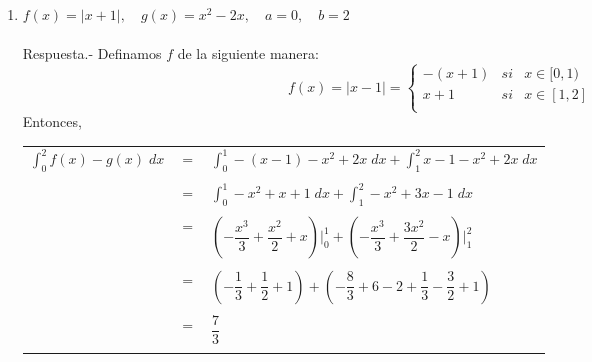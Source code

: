 \begin{enumerate}[\bfseries 1.]
\item $f(x) = |x+1|,\quad g(x)=x^2-2x, \quad a=0, \quad b=2$\\\\
    Respuesta.- \; Definamos $f$ de la siguiente manera:
	$$f(x)= |x-1| = \left\{
	    \begin{array}{rcl}
		-(x+1)&si&x\in[0,1)\\
		x+1&si&x\in [1,2]\\
	    \end{array}
	    \right.$$
	    Entonces, 
	    \begin{center} 
		\begin{tabular}{rcl}
		    $\displaystyle\int_0^2 f(x)-g(x) \; dx$&$=$&$\displaystyle\int_0^1 -(x-1)-x^2+2x\; dx + \int_1^2 x-1-x^2+2x \; dx$\\\\
		    & $=$ &$\displaystyle\int_0^1 -x^2+x+1\; dx + \int_1^2 -x^2+3x - 1 \; dx$\\\\
		    & $=$ & $\left(-\dfrac{x^3}{3} + \dfrac{x^2}{2} + x\right)\bigg|_0^1 + \left(-\dfrac{x^3}{3} + \dfrac{3x^2}{2} -x\right)\bigg|_1^2$\\\\
		    & $=$ & $\left(-\dfrac{1}{3} + \dfrac{1}{2} + 1\right)+\left(-\dfrac{8}{3} + 6-2+\dfrac{1}{3} -\dfrac{3}{2} + 1\right)$\\\\
		    & $=$ & $\dfrac{7}{3}$\\\\
		\end{tabular}
	    \end{center}


\end{enumerate}

